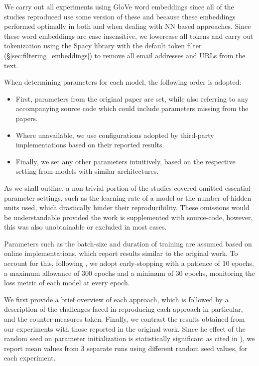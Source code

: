 \documentclass[../../fyp.tex]{subfiles}
\begin{document}
We carry out all experiments using GloVe word embeddings \cite{pennington} since all of the studies reproduced use some version of these and because these embeddings performed optimally in both \cite{moore2018} and \cite{bhuwandhingra2017} when dealing with NN based approaches. Since these word embeddings are case insensitive, we lowercase all tokens and carry out tokenization using the Spacy library with the default token filter (\S\ref{sec:filtering_embeddings}) to remove all email addresses and URLs from the text.

When determining parameters for each model, the following order is adopted: 
\begin{itemize}
	\item First, parameters from the original paper are set, while also referring to any accompanying source code which could include parameters missing from the papers.
	\item Where unavailable, we use configurations adopted by third-party implementations based on their reported results.
	\item Finally, we set any other parameters intuitively, based on the respective setting from models with similar architectures.
\end{itemize}
   
As we shall outline, a non-trivial portion of the studies covered omitted essential parameter settings, such as the learning-rate of a model or the number of hidden units used, which drastically hinder their reproducibility. These omissions would be understandable provided the work is supplemented with source-code, however, this was also unobtainable or excluded in most cases.

Parameters such as the batch-size and duration of training are assumed based on online implementations, which report results similar to the original work. To account for this, following \citet{moore2018}, we adopt early-stopping with a patience of 10 epochs, a maximum allowance of 300 epochs and a minimum of 30 epochs, monitoring the loss metric of each model at every epoch. 

We first provide a brief overview of each approach, which is followed by a description of the challenges faced in reproducing each approach in particular, and the counter-measures taken. Finally, we contrast the results obtained from our experiments with those reported in the original work. Since he effect of the random seed on parameter initialization is statistically significant \citet{reimers2017} as cited in \cite{moore2018}), we report mean values from 3 separate runs using different random seed values, for each experiment. 
\end{document}
